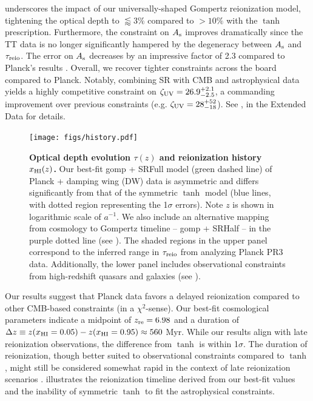  underscores the impact of our universally-shaped
Gompertz reionization model, tightening the optical depth to  $\lessapprox 3\%$
compared to $> 10\%$ with the $\tanh$ prescription.
Furthermore, the constraint on $A_\mathrm{s}$ improves dramatically since the TT
data is no longer significantly hampered by the degeneracy between $A_\mathrm{s}$
and $\tau_{\mathrm{reio}}$.
The error on $A_\mathrm{s}$ decreases by an impressive factor of 2.3 compared to
Planck's results \cite{Planck2020a}.
Overall, we recover tighter constraints across the board compared to
Planck. Notably, combining SR with CMB and astrophysical data
yields a highly competitive constraint on $\zeta_\mathrm{UV} = 26.9^{+2.1}_{-2.5}$, a 
commanding improvement over previous constraints
(e.g. $\zeta_\mathrm{UV} = 28^{+52}_{-18}$)\cite{Greig2017}. See
,  in the Extended Data for details.

\begin{figure}[tb]
\centering
\texttt{[image: figs/history.pdf]}
\caption{\textbf{Optical depth evolution $\tau(z)$ and reionization
history $x_{\mathrm{HI}}(z)$.}
Our best-fit gomp + SRFull model (green dashed line) of Planck + damping wing (DW) data is
asymmetric and differs significantly from that of the symmetric $\tanh$
model (blue lines, with dotted region representing the 1$\sigma$
errors). Note $z$ is shown in logarithmic scale of $a^{-1}$.
We also include an alternative mapping from cosmology to Gompertz
timeline -- gomp + SRHalf -- in the purple dotted line (see ).
The shaded regions in the upper panel correspond to the inferred range
in $\tau_{\mathrm{reio}}$ from analyzing Planck PR3 data.
Additionally, the lower panel includes observational constraints from
high-redshift quasars and galaxies (see ). 
}
\label{fig:history}
\end{figure}

Our results suggest that Planck data favors a delayed reionization
compared to other CMB-based constraints (in a $\chi^2$-sense).
Our best-fit cosmological parameters indicate a midpoint of $z_{\mathrm{re}} =
6.98$ and a duration of $\Delta z \equiv z(x_{\mathrm{HI}} = 0.05) - z(x_{\mathrm{HI}} =
0.95) \approx 560 $ Myr.
While our results align with late reionization observations, the
difference from $\tanh$ is within 1$\sigma$.
The duration of reionization, though better suited to observational
constraints compared to $\tanh$, might still be considered
somewhat rapid in the context of late reionization scenarios
\cite{Cain2021}.
 illustrates the reionization timeline derived
from our best-fit values and the inability of symmetric $\tanh$
to fit the astrophysical constraints. 

